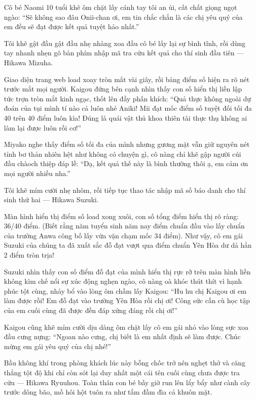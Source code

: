 \documentclass[../main.tex]{subfiles}
\begin{document}
Cô bé Naomi 10 tuổi khẽ ôm chặt lấy cánh tay tôi an ủi, cất chất giọng ngọt ngào: ``Sẽ không sao đâu Onii-chan ơi, em tin chắc chắn là các chị yêu quý của em đều sẽ đạt được kết quả tuyệt hảo nhất.''

Tôi khẽ gật đầu gật đầu nhẹ nhàng xoa đầu cô bé lấy lại sự bình tĩnh, rồi dùng tay nhanh nhẹn gõ bàn phím nhập mã tra cứu kết quả cho thí sinh đầu tiên — Hikawa Mizuha.

Giao diện trang web load xoay tròn mất vài giây, rồi bảng điểm số hiện ra rõ nét trước mắt mọi người. Kaigou đứng bên cạnh nhìn thấy con số hiển thị liền lập tức trợn tròn mắt kinh ngạc, thốt lên đầy phấn khích: ``Quả thực không ngoài dự đoán của tụi mình tí nào cả luôn nhé Aniki! Mii đạt mốc điểm số tuyệt đối tối đa 40 trên 40 điểm luôn kìa! Đúng là quái vật thủ khoa thiên tài thực thụ không ai làm lại được luôn rồi cơ!''

Miyako nghe thấy điểm số tối đa của mình nhưng gương mặt vẫn giữ nguyên nét tỉnh bơ thản nhiên hệt như không có chuyện gì, cô nàng chỉ khẽ gập người cúi đầu chàoch thiệp đáp lễ: ``Dạ, kết quả thế này là bình thường thôi ạ, em cảm ơn mọi người nhiều nha.''

Tôi khẽ mỉm cười nhẹ nhõm, rồi tiếp tục thao tác nhập mã số báo danh cho thí sinh thứ hai — Hikawa Suzuki.

Màn hình hiển thị điểm số load xong xuôi, con số tổng điểm hiển thị rõ ràng: 36/40 điểm. (Biết rằng năm tuyển sinh năm nay điểm chuẩn đầu vào lấy chuẩn của trường Anwa công bố lấy vừa vặn chạm mốc 34 điểm). Như vậy, cô em gái Suzuki của chúng ta đã xuất sắc đỗ đạt vượt qua điểm chuẩn Yên Hòa dư dả hẳn 2 điểm tròn trịa!

Suzuki nhìn thấy con số điểm đỗ đạt của mình hiển thị rực rỡ trên màn hình liền không kìm chế nổi sự xúc động nghẹn ngào, cô nàng oà khóc thút thít vì hạnh phúc tột cùng, nhảy bổ vào lòng ôm chầm lấy Kaigou: ``Hu hu chị Kaigou ơi em làm được rồi! Em đỗ đạt vào trường Yên Hòa rồi chị ơi! Công sức cần cù học tập của em cuối cùng đã được đền đáp xứng đáng rồi chị ơi!''

Kaigou cũng khẽ mỉm cười dịu dàng ôm chặt lấy cô em gái nhỏ vào lòng sực xoa đầu cưng nựng: ``Ngoan nào cưng, chị biết là em nhất định sẽ làm được. Chúc mừng em gái yêu quý của chị nhé!''

Bầu không khí trong phòng khách lúc này bỗng chốc trở nên nghẹt thở và căng thẳng tột độ khi chỉ còn sót lại duy nhất một cái tên cuối cùng chưa được tra cứu — Hikawa Ryuuhou. Toàn thân con bé bấy giờ run lên lẩy bẩy như cành cây trước dông bão, mồ hôi hột tuôn ra như tắm đầm đìa cả khuôn mặt.
\end{document}
